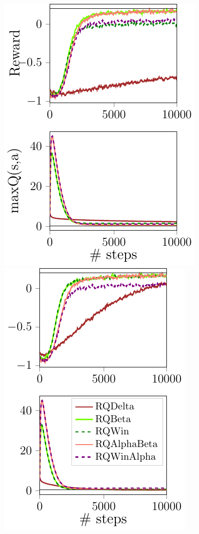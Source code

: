 \documentclass[portrait,a0paper,fontscale=0.312]{baposter}
\begin{document}
\begin{poster}
{\begin{minipage}{0.6\textwidth}
\begin{center}
\begin{minipage}{0.5\textwidth}
    \end{minipage}%
    \hfill
    \begin{minipage}{0.5\textwidth}
	\includegraphics[scale=0.55]{./imgs/gridHasselt/QDecs1.pdf}
	\includegraphics[scale=0.55]{./imgs/gridHasselt/QDecs08.pdf}

\end{minipage}
\end{center}
\end{minipage}}
\end{poster}
\end{document}
